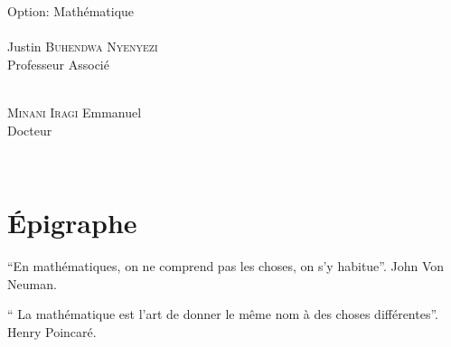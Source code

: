 \documentclass[11pt,a4paper,oneside]{book}
\begin{document}
\begin{titlepage}
\begin{center}
\begin{flushleft}
			\vspace{0.3cm}
			\hspace{6cm}
			{}\\
			\hspace{6cm}
			{}\\
			\vspace{0.3cm}
			\hspace{6cm}
			Option: Mathématique\\
			\vspace{0.2cm}
			\hspace{6cm}
			{}\\
			\hspace{6cm}
			Justin \textsc{Buhendwa Nyenyezi}\\
			\hspace{7cm}
			{\ttfamily Professeur Associé}
			
			\vspace{0.2cm}
			\hspace{6cm}
			{}\\
			\hspace{6cm}
			 \textsc{Minani Iragi} Emmanuel\\
			\hspace{7cm}
			{\ttfamily Docteur}
		\end{flushleft}
		
		\vspace{0.2cm}
		{} \\
		\color{black}
	\end{center}
\end{titlepage}

\frontmatter
\tableofcontents
\listoffigures
\listoftables

\chapter*{Épigraphe}
\par\textquotedblleft En mathématiques, on ne comprend pas les choses, on s'y habitue\textquotedblright. John Von Neuman.

\par\textquotedblleft
La mathématique est l'art de donner le même nom à des choses différentes\textquotedblright. Henry Poincaré.
\end{document}
